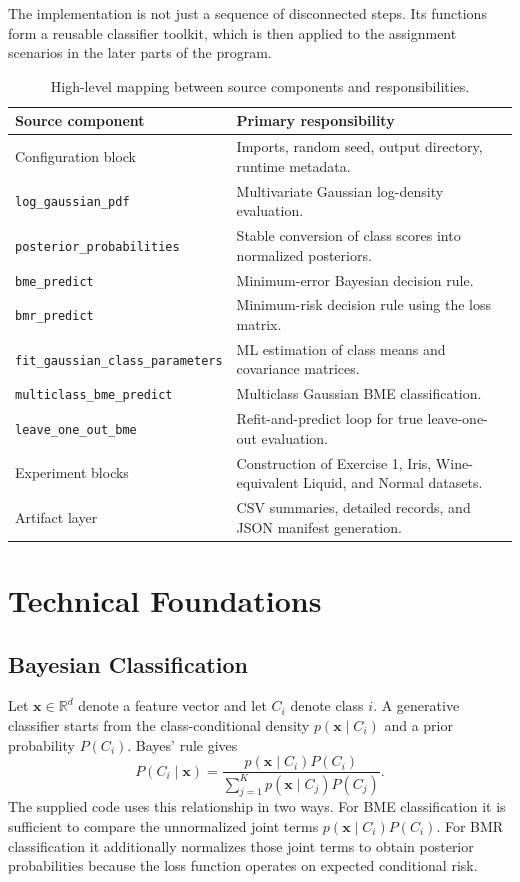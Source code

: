 \documentclass[11pt,a4paper]{article}
\newcommand{\code}[1]{\texttt{#1}}
\begin{document}
The implementation is not just a sequence of disconnected steps. Its functions form a reusable classifier toolkit, which is then applied to the assignment scenarios in the later parts of the program.

\begin{table}[ht]
\centering
\caption{High-level mapping between source components and responsibilities.}
\begin{tabularx}{\textwidth}{@{}p{}X@{}}
\toprule
\textbf{Source component} & \textbf{Primary responsibility}\\
\midrule
Configuration block & Imports, random seed, output directory, runtime metadata.\\
\code{log\_gaussian\_pdf} & Multivariate Gaussian log-density evaluation.\\
\code{posterior\_probabilities} & Stable conversion of class scores into normalized posteriors.\\
\code{bme\_predict} & Minimum-error Bayesian decision rule.\\
\code{bmr\_predict} & Minimum-risk decision rule using the loss matrix.\\
\code{fit\_gaussian\_class\_parameters} & ML estimation of class means and covariance matrices.\\
\code{multiclass\_bme\_predict} & Multiclass Gaussian BME classification.\\
\code{leave\_one\_out\_bme} & Refit-and-predict loop for true leave-one-out evaluation.\\
Experiment blocks & Construction of Exercise 1, Iris, Wine-equivalent Liquid, and Normal datasets.\\
Artifact layer & CSV summaries, detailed records, and JSON manifest generation.\\
\bottomrule
\end{tabularx}
\end{table}

\section{Technical Foundations}

\subsection{Bayesian Classification}
Let $\mathbf{x}\in\mathbb{R}^{d}$ denote a feature vector and let $C_i$ denote class $i$. A generative classifier starts from the class-conditional density $p(\mathbf{x}\mid C_i)$ and a prior probability $P(C_i)$. Bayes' rule gives
\begin{equation}
P(C_i\mid \mathbf{x})
=
\frac{p(\mathbf{x}\mid C_i)P(C_i)}{\sum_{j=1}^{K}p(\mathbf{x}\mid C_j)P(C_j)}.
\end{equation}
The supplied code uses this relationship in two ways. For BME classification it is sufficient to compare the unnormalized joint terms $p(\mathbf{x}\mid C_i)P(C_i)$. For BMR classification it additionally normalizes those joint terms to obtain posterior probabilities because the loss function operates on expected conditional risk.
\end{document}
